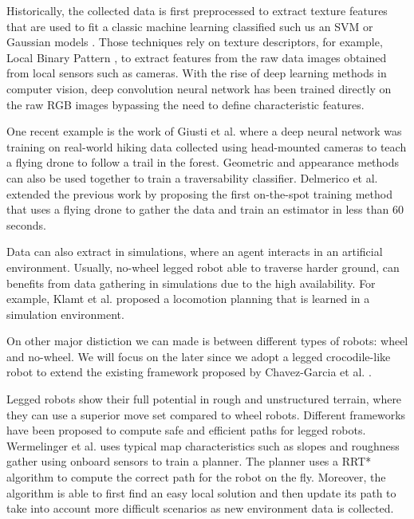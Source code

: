 \documentclass[../document.tex]{subfiles}
\begin{document}
Historically, the collected data is first preprocessed to extract texture features that are used to fit a classic machine learning classified such us an SVM \cite{ugur2010traversability} or Gaussian models \cite{sofman2006improving}. Those techniques rely on texture descriptors, for example, Local Binary Pattern \cite{ojala2002multiresolution}, to extract features from the raw data images obtained from local sensors such as cameras.
With the rise of deep learning methods in computer vision, deep convolution neural network has been trained directly on the raw RGB images bypassing the need to define characteristic features.

One recent example is the work of Giusti et al. \cite{giusti2015amachine} where a deep neural network was training on real-world hiking data collected using head-mounted cameras to teach a flying drone to follow a trail in the forest. 
Geometric and appearance methods can also be used together to train a traversability classifier. Delmerico et al.\cite{delmerico2017onthespot} extended the previous work \cite{delmerico2016active} by proposing the first on-the-spot training method that uses a flying drone to gather the data and train an estimator in less than 60 seconds. 

Data can also extract in simulations, where an agent interacts in an artificial environment. Usually, no-wheel legged robot able to traverse harder ground, can benefits from data gathering in simulations due to the high availability. For example, Klamt et al. \cite{tobias2017anytime} proposed a locomotion planning that is learned in a simulation environment. 

On other major distiction we can made is between different types of robots: wheel and no-wheel. We will focus on the later since we adopt a legged crocodile-like robot to extend the existing framework proposed by Chavez-Garcia et al. \cite{omar2018traversability}.

Legged robots show their full potential in rough and unstructured terrain, where they can use a superior move set compared to wheel robots. Different frameworks have been proposed to compute safe and efficient paths for legged robots. Wermelinger et al. \cite{wermelinger2016navigation} uses typical map characteristics such as slopes and roughness gather using onboard sensors to train a planner. The planner uses a RRT* algorithm to compute the correct path for the robot on the fly. Moreover, the algorithm is able to first find an easy local solution and then update its path to take into account more difficult scenarios as new environment data is collected. 
\end{document}
